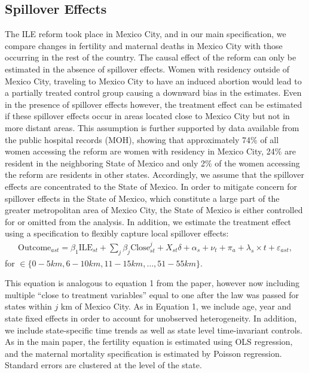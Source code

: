 \documentclass[a4paper, 11pt]{article}
\begin{document}
\begin{spacing}{1.4}
\subsection{Spillover Effects}\label{Spillover}
The ILE reform took place in Mexico City, and in our main specification, we compare changes
in fertility and maternal deaths in Mexico City with those occurring in the rest of the
country. The causal effect of the reform can only be estimated in the absence of spillover
effects. Women with residency outside of Mexico City, traveling to Mexico City to have an
induced abortion would lead to a partially treated control group causing a downward bias in
the estimates.  Even in the presence of spillover effects however, the treatment effect can
be estimated if these spillover effects occur in areas located close to Mexico City but not
in more distant areas. This assumption is further supported by data available from the
public hospital records (MOH), showing that approximately 74\% of all women accessing the
reform are women with residency in Mexico City, 24\% are resident in the neighboring State
of Mexico and only 2\% of the women accessing the reform are residents in other states.
Accordingly, we assume that the spillover effects are concentrated to the State of Mexico.
In order to mitigate concern for spillover effects in the State of Mexico, which constitute
a large part of the greater metropolitan area of Mexico City, the State of Mexico is either
controlled for or omitted from the analysis. In addition, we estimate the treatment effect
using a specification to flexibly capture local spillover effects:
\begin{eqnarray}\label{eq3}
  \text{Outcome}_{ast}= \beta_{1} \text{ILE}_{st} + \sum_{j}\beta_{j}\text{Close}^j_{st} +
  X_{st}\delta +\alpha_{s} + \nu_{t} +\pi_{a}+ \lambda_{s}\times t +\varepsilon_{ast},
\end{eqnarray}
for $ \in \{0-5km, 6-10km, 11-15km, \ldots, 51-55km\}$.

This equation is analogous to equation 1 from the paper, however now including multiple
``close to treatment variables'' equal to one after the law was passed for states within
$j$ km of Mexico City. As in Equation 1, we include age, year and state fixed effects in
order to account for unobserved heterogeneity. In addition, we include state-specific
time trends as well as state level time-invariant controls. As in the main paper, the
fertility equation is estimated using OLS regression, and the maternal mortality
specification is estimated by Poisson regression.  Standard errors are clustered at the
level of the state.


\end{spacing}
\end{document}
